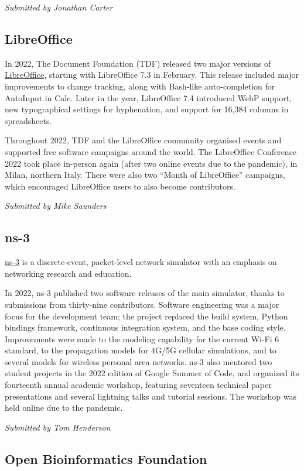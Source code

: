 \documentclass[a4paper]{report}
\begin{document}
{\em Submitted by Jonathan Carter}

\subsection{LibreOffice}

In 2022, The Document Foundation (TDF) released two major versions of \href{https://www.libreoffice.org/}{LibreOffice}, starting with LibreOffice 7.3 in February. This release included major improvements to change tracking, along with Bash-like auto-completion for AutoInput in Calc. Later in the year, LibreOffice 7.4 introduced WebP support, new typographical settings for hyphenation, and support for 16,384 columns in spreadsheets.

Throughout 2022, TDF and the LibreOffice community organised events and supported free software campaigns around the world. The LibreOffice Conference 2022 took place in-person again (after two online events due to the pandemic), in Milan, northern Italy. There were also two ``Month of LibreOffice'' campaigns, which encouraged LibreOffice users to also become contributors.

{\em Submitted by Mike Saunders}

\subsection{ns-3}

\href{https://www.nsnam.org}{ns-3} is a discrete-event, packet-level network simulator with an emphasis on networking research and education.

In 2022, ns-3 published two software releases of the main simulator, thanks to submissions from thirty-nine contributors.  Software engineering was a major focus for the development team; the project replaced the build system, Python bindings framework, continuous integration system, and the base coding style.  Improvements were made to the modeling capability for the current Wi-Fi 6 standard, to the propagation models for 4G/5G cellular simulations, and to several models for wireless personal area networks.  ns-3 also mentored two student projects in the 2022 edition of Google Summer of Code, and organized its fourteenth annual academic workshop, featuring seventeen technical paper presentations and several lightning talks and tutorial sessions. The workshop was held online due to the pandemic.

{\em Submitted by Tom Henderson}

\subsection{Open Bioinformatics Foundation}
\end{document}
